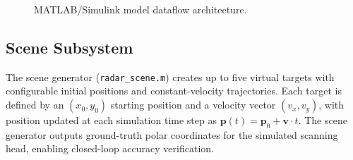 \documentclass[conference]{IEEEtran}
\begin{document}
\begin{figure}[htbp]
\centering
\setlength{\fboxsep}{6pt}%
\caption{MATLAB/Simulink model dataflow architecture.}
\label{fig:simulink_arch}
\end{figure}

\subsection{Scene Subsystem}
The scene generator (\texttt{radar\_scene.m}) creates up to five virtual targets with configurable initial positions and constant-velocity trajectories. Each target is defined by an $(x_0, y_0)$ starting position and a velocity vector $(v_x, v_y)$, with position updated at each simulation time step as $\mathbf{p}(t) = \mathbf{p}_0 + \mathbf{v} \cdot t$. The scene generator outputs ground-truth polar coordinates for the simulated scanning head, enabling closed-loop accuracy verification.
\end{document}
